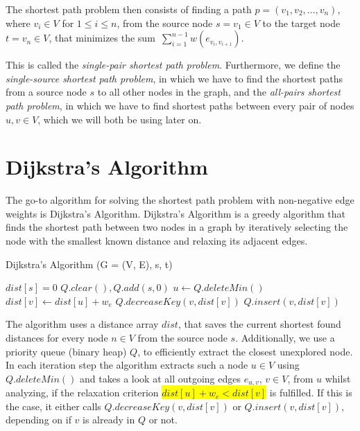 \documentclass[acmsmall,nonacm,screen,review]{acmart}
\begin{document}
The shortest path problem then consists of finding a path $p = (v_1, v_2, \ldots, v_n)$, where $v_i \in V$ for $1 \leq i \leq n$, from the source node
$s = v_1 \in V$ to the target node $t = v_n \in V$, that minimizes the sum~$\sum_{i=1}^{n-1} w(e_{v_i, v_{i+1}})$.

This is called the \textit{single-pair shortest path problem}. Furthermore, we define the \textit{single-source shortest path problem},
in which we have to find the shortest paths from a source node $s$ to all other nodes in the graph, and the \textit{all-pairs shortest path problem},
in which we have to find shortest paths between every pair of nodes $u,v \in V$, which we will both be using later on.

\section{Dijkstra's Algorithm}
\label{3}
The go-to algorithm for solving the shortest path problem with non-negative edge weights is Dijkstra's Algorithm.
Dijkstra's Algorithm is a greedy algorithm that finds the shortest path between two nodes in a graph by iteratively selecting the node with the smallest known
distance and relaxing its adjacent edges.

\begin{algorithm}
  \captionsetup{labelformat=empty, labelsep=none}
  \caption{Dijkstra's Algorithm (G = (V, E), s, t)}
  \begin{algorithmic}[1]
      \State $dist[s] = 0$
      \State $Q.clear(), Q.add(s,0)$
          \State $u \gets Q.deleteMin()$
                  \State $dist[v] \gets dist[u] + w_e$
                   \State $Q.decreaseKey(v, dist[v])$
                  \Else{} \State $Q.insert(v, dist[v])$
                  \EndIf
              \EndIf
          \EndFor
      \EndWhile
  \end{algorithmic}
\end{algorithm}

The algorithm uses a distance array $dist$, that saves the current shortest found distances for every node $n \in V$ from the source node $s$.
Additionally, we use a priority queue (binary heap) $Q$, to efficiently extract the closest unexplored node. In each iteration step the algorithm
extracts such a node $u \in V$ using $Q.deleteMin()$ and takes a look at all outgoing edges $e_{u,v}$, $v\in V$, from $u$ whilst analyzing, if the relaxation
criterion \colorbox{yellow}{$dist[u] + w_e < dist[v]$} is fulfilled. If this is the case, it either calls $Q.decreaseKey(v, dist[v])$ or
$Q.insert(v, dist[v])$, depending on if $v$ is already in $Q$ or not.
\end{document}

